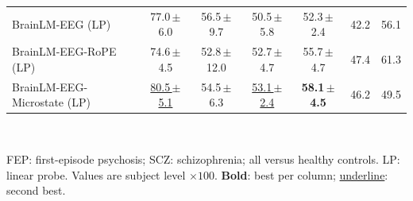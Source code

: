 \begin{table}[htbp]
{\begin{tabular}{l cc cc cc}
    \midrule
    BrainLM-EEG (LP) & 77.0\,{\scriptsize$\pm$6.0} & 56.5\,{\scriptsize$\pm$9.7} & 50.5\,{\scriptsize$\pm$5.8} & 52.3\,{\scriptsize$\pm$2.4} & 42.2 & 56.1 \\
    BrainLM-EEG-RoPE (LP) & 74.6\,{\scriptsize$\pm$4.5} & 52.8\,{\scriptsize$\pm$12.0} & 52.7\,{\scriptsize$\pm$4.7} & 55.7\,{\scriptsize$\pm$4.7} & 47.4 & 61.3 \\
    BrainLM-EEG-Microstate (LP) & \underline{80.5\,{\scriptsize$\pm$5.1}} & 54.5\,{\scriptsize$\pm$6.3} & \underline{53.1\,{\scriptsize$\pm$2.4}} & \textbf{58.1\,{\scriptsize$\pm$4.5}} & 46.2 & 49.5 \\
    \bottomrule
  \end{tabular}%
  }
  \\[3pt]
  \begin{minipage}{\linewidth}\footnotesize\raggedright
    FEP: first-episode psychosis; SCZ: schizophrenia; all versus healthy controls. LP: linear probe. Values are subject level $\times 100$. \textbf{Bold}: best per column; \underline{underline}: second best.
  \end{minipage}
\end{table}
